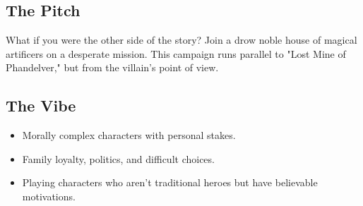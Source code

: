 \documentclass[a4paper, 8pt]{extarticle}
\begin{document}
\color{DrowPurple}


\vspace{2cm}

\subsection*{\textbf{The Pitch}}
What if you were the other side of the story? Join a drow noble house of magical artificers on a desperate mission. This campaign runs parallel to "Lost Mine of Phandelver," but from the villain's point of view.

\subsection*{\textbf{The Vibe}}
\begin{itemize}
    \item Morally complex characters with personal stakes.
    \item Family loyalty, politics, and difficult choices.
    \item Playing characters who aren't traditional heroes but have believable motivations.
\end{itemize}
\end{document}
